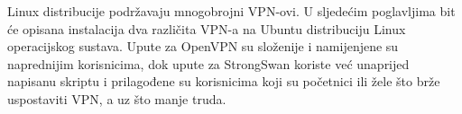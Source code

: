 \hfill Linux distribucije podržavaju mnogobrojni VPN-ovi. U sljedećim poglavljima bit će opisana instalacija dva različita VPN-a na Ubuntu distribuciju Linux operacijskog sustava. Upute za OpenVPN su složenije i namijenjene su naprednijim korisnicima, dok upute za StrongSwan koriste već unaprijed napisanu skriptu i prilagođene su korisnicima koji su početnici ili žele što brže uspostaviti VPN, a uz što manje truda.